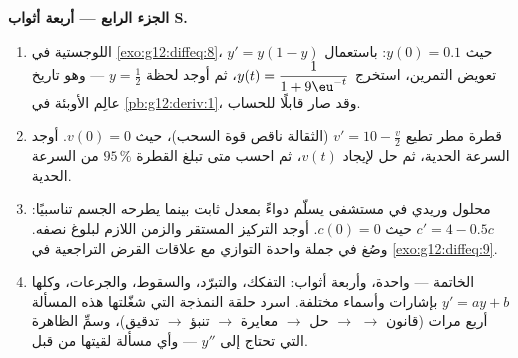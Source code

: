 \begin{problem}
\medskip
\noindent\textbf{الجزء الرابع --- أربعة أثواب  S.}
\begin{enumerate}[resume]
  \item {} اللوجستية في \cref{exo:g12:diffeq:8}،
        $y' = y(1 - y)$ حيث $y(0) = 0.1$: باستعمال تعويض
        التمرين، استخرج
        $y(t) = \dfrac{1}{1 + 9\eu^{-t}}$، ثم أوجد لحظة
         $y = \frac12$ --- وهو
        تاريخ عالِم الأوبئة في \cref{pb:g12:deriv:1}، وقد صار
        قابلًا للحساب.
  \item قطرة مطر تطيع $v' = 10 - \frac v2$ (الثقالة ناقص
        قوة السحب)، حيث $v(0) = 0$. أوجد السرعة الحدية، ثم حل
        لإيجاد $v(t)$، ثم احسب متى تبلغ القطرة
        $95\,\%$ من السرعة الحدية.
  \item محلول وريدي في مستشفى يسلّم دواءً بمعدل ثابت بينما
        يطرحه الجسم تناسبيًا:
        $c' = 4 - 0.5c$ حيث $c(0) = 0$. أوجد التركيز
        المستقر والزمن اللازم لبلوغ نصفه. وصُغ
        في جملة واحدة التوازي مع علاقات القرض التراجعية في
        \cref{exo:g12:diffeq:9}.
  \item الخاتمة ---  واحدة، وأربعة أثواب: التفكك، والتبرّد،
        والسقوط، والجرعات، وكلها $y' = ay + b$ بإشارات
        وأسماء مختلفة. اسرد حلقة النمذجة التي شغّلتها هذه المسألة
        أربع مرات (قانون $\to$  $\to$ حل $\to$
        معايرة $\to$ تنبؤ $\to$ تدقيق)، وسمِّ
        الظاهرة التي تحتاج إلى $y''$ --- وأي مسألة
        لقيتها من قبل.
\end{enumerate}
\end{problem}
